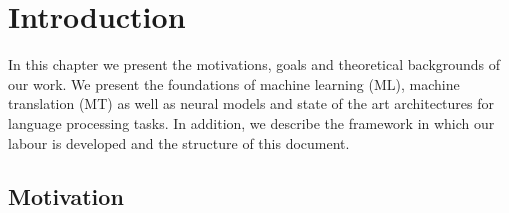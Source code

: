 \documentclass[11pt,english,listoffigures,listoftables]{tfgetsinf}
\begin{document}
\begin{abstract}[english]
Machine translation is one of the most active areas within Artificial Intelligence, particularly in the field of Machine Learning. Recently, this area has been the focus of attention by major technology figures such as Google, Facebook, Microsoft, etc. due to the performance improvements obtained by this technology thanks to the incorporation of artificial neural networks. One of the main reasons for this attention is the enormous growth of streaming audiovisual content platforms (for example, YouTube and Twitch) and video-conferencing (for example, Zoom and Webex). In this context, a very important aspect is the adaptation of conventional techniques and models to be used in the streaming scenario, that is, the translation of a constant input flow under response time (latency) constraints. In this work it is proposed to study and implement advanced models of neural MT in streaming, from English into European languages. For this, data, technology and experience of the VRAIN MLLP group, acquired in the framework of research and technology transfer projects developed in recent years, will be used.
\end{abstract}


\mainmatter


\chapter{Introduction}\label{intro}

In this chapter we present the motivations, goals and theoretical backgrounds of our work. We present the foundations of machine learning (ML), machine translation (MT) as well as neural models and state of the art architectures for language processing tasks. In addition, we describe the framework in which our labour is developed and the structure of this document.

\section{Motivation}
\end{document}
